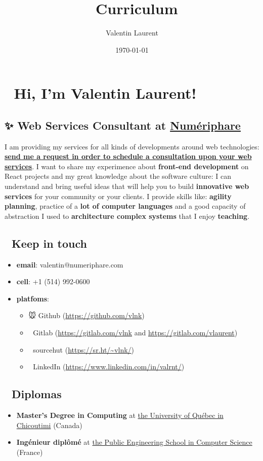 \documentclass[11pt]{article}
\author{Valentin Laurent}
\date{\today}
\title{👔 Curriculum}
\begin{document}
\maketitle
\section{👋 Hi, I'm Valentin Laurent!}
\label{sec:orgae1c908}
\subsection{✨ \textbf{Web Services Consultant} at \href{https://www.numeriphare.com/}{Numériphare}}
\label{sec:org9adf467}
I am providing my services for all kinds of developments around web technologies: \textbf{\href{https://framaforms.org/numeriphare-contact-en-1666988238}{send me a request in order to schedule a consultation upon your web services}}. I want to share my experimence about \textbf{front-end development} on React projects and my great knowledge about the software culture: I can understand and bring useful ideas that will help you to build \textbf{innovative web services} for your community or your clients. I provide skills like: \textbf{agility planning}, practice of a \textbf{lot of computer languages} and a good capacity of abstraction I used to \textbf{architecture complex systems} that I enjoy \textbf{teaching}.

\subsection{📇 Keep in touch}
\label{sec:orgb1919a9}
\begin{itemize}
\item \textbf{email}: valentin@numeriphare.com
\item \textbf{cell}: +1 (514) 992-0600
\item \textbf{platfoms}:
\begin{itemize}
\item 🐭 Github (\url{https://github.com/vlnk})
\item 🚀 Gitlab (\url{https://gitlab.com/vlnk} and \url{https://gitlab.com/vlaurent})
\item 🌲 sourcehut (\url{https://sr.ht/\~vlnk/})
\item 👞 LinkedIn (\url{https://www.linkedin.com/in/valrnt/})
\end{itemize}
\end{itemize}

\subsection{🏫 Diplomas}
\label{sec:org5d4d516}
\begin{itemize}
\item \textbf{Master's Degree in Computing} at \href{https://www.linkedin.com/school/choisiruqac/}{the University of Québec in Chicoutimi} (Canada)
\item \textbf{Ingénieur diplômé} at \href{https://www.clermont-auvergne-inp.fr/ecoles/isima/}{the Public Engineering School in Computer Science} (France)
\end{itemize}
\end{document}
